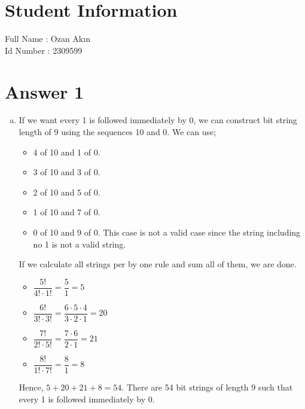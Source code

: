 \documentclass[12pt]{article}
\begin{document}
\section*{Student Information } 
Full Name :  Ozan Akın\\
Id Number :  2309599 \\

\section*{Answer 1}
    \begin{enumerate}[a)]
        \item If we want every 1 is followed immediately by 0, we can construct bit string length of 9 using the sequences 10 and 0. We can use;
            \begin{itemize}
                \item 4 of 10 and 1 of 0.
                \item 3 of 10 and 3 of 0.
                \item 2 of 10 and 5 of 0.
                \item 1 of 10 and 7 of 0.
                \item 0 of 10 and 9 of 0. This case is not a valid case since the string including no 1 is not a     valid string.
            \end{itemize}{}
            If we calculate all strings per by one rule and sum all of them, we are done.
            \begin{itemize}
                \item $\dfrac{5!}{4! \cdot 1!} = \dfrac{5}{1} = 5$
                \item $\dfrac{6!}{3! \cdot 3!} = \dfrac{6 \cdot 5 \cdot 4}{3 \cdot 2 \cdot 1} = 20$
                \item $\dfrac{7!}{2! \cdot 5!} = \dfrac{7 \cdot 6}{2 \cdot 1} = 21$
                \item $\dfrac{8!}{1! \cdot 7!} = \dfrac{8}{1} = 8$
            \end{itemize}{}
            Hence, $5 + 20 + 21 + 8 = 54$. There are 54 bit strings of length 9 such that every 1 is followed immediately by 0.
        

\end{enumerate}
\end{document}

